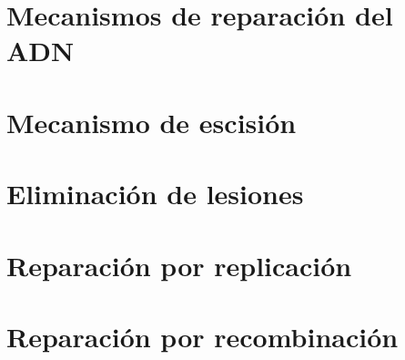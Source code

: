 


\section{Mecanismos de reparación del ADN}



\section{Mecanismo de escisión}



\section{Eliminación de lesiones}



\section{Reparación por replicación}



\section{Reparación por recombinación}


